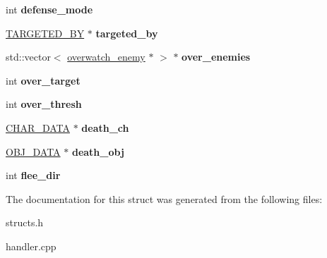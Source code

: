 \begin{DoxyCompactItemize}
\item 
\hypertarget{structchar__data_a84e856daa1f5da97f5497da171888b3f}{int {\bfseries defense\-\_\-mode}}\label{structchar__data_a84e856daa1f5da97f5497da171888b3f}

\item 
\hypertarget{structchar__data_a2cf40f00def92b785daadfaca6def6dd}{\hyperlink{structtargeted__bys}{T\-A\-R\-G\-E\-T\-E\-D\-\_\-\-B\-Y} $\ast$ {\bfseries targeted\-\_\-by}}\label{structchar__data_a2cf40f00def92b785daadfaca6def6dd}

\item 
\hypertarget{structchar__data_aee8c8a5f8fe5f91141c9d5bab432e9c5}{std\-::vector$<$ \hyperlink{structoverwatch__enemy}{overwatch\-\_\-enemy} $\ast$ $>$ $\ast$ {\bfseries over\-\_\-enemies}}\label{structchar__data_aee8c8a5f8fe5f91141c9d5bab432e9c5}

\item 
\hypertarget{structchar__data_acac06ecc6bd5a27ba18bf00de42d491c}{int {\bfseries over\-\_\-target}}\label{structchar__data_acac06ecc6bd5a27ba18bf00de42d491c}

\item 
\hypertarget{structchar__data_a8d07f96507e48e787ff1366c02559965}{int {\bfseries over\-\_\-thresh}}\label{structchar__data_a8d07f96507e48e787ff1366c02559965}

\item 
\hypertarget{structchar__data_aa0de5074106c9bacde36bbad35e59412}{\hyperlink{structchar__data}{C\-H\-A\-R\-\_\-\-D\-A\-T\-A} $\ast$ {\bfseries death\-\_\-ch}}\label{structchar__data_aa0de5074106c9bacde36bbad35e59412}

\item 
\hypertarget{structchar__data_a2fee677813a04d34449256153dc6a236}{\hyperlink{structobj__data}{O\-B\-J\-\_\-\-D\-A\-T\-A} $\ast$ {\bfseries death\-\_\-obj}}\label{structchar__data_a2fee677813a04d34449256153dc6a236}

\item 
\hypertarget{structchar__data_ac61f566381233b16f79ce60741be7c87}{int {\bfseries flee\-\_\-dir}}\label{structchar__data_ac61f566381233b16f79ce60741be7c87}

\end{DoxyCompactItemize}


The documentation for this struct was generated from the following files\-:\begin{DoxyCompactItemize}
\item 
structs.\-h\item 
handler.\-cpp\end{DoxyCompactItemize}
